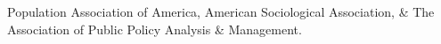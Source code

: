 

\begin{cvparagraph}

Population Association of America, American Sociological Association, \& The Association of Public Policy Analysis \& Management.
\end{cvparagraph}